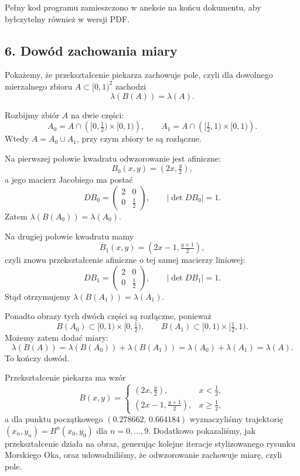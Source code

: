 \documentclass[11pt,a4paper]{article}
\newcommand{\abs}[1]{\left\lvert #1 \right\rvert}
\newcommand{\Leb}{\lambda}
\theoremstyle{plain}
\theoremstyle{definition}
\begin{document}
\begin{rozwiazaniebox}
Pe\l ny kod programu zamieszczono w aneksie na ko\'ncu dokumentu, aby by\l czytelny r\'ownie\.z w wersji PDF.

\subsection*{6. Dow\'od zachowania miary}

Poka\.zemy, \.ze przekszta\l cenie piekarza zachowuje pole, czyli dla dowolnego mierzalnego zbioru
\(A \subset [0,1)^2\) zachodzi
\[
    \Leb(B(A))=\Leb(A).
\]

Rozbijmy zbi\'or \(A\) na dwie cz\k{e}\'sci:
\[
    A_0 = A \cap \left([0,\tfrac{1}{2}) \times [0,1)\right), \qquad
    A_1 = A \cap \left([\tfrac{1}{2},1) \times [0,1)\right).
\]
Wtedy \(A=A_0 \cup A_1\), przy czym zbiory te s\k{a} roz\l \k{a}czne.

Na pierwszej po\l owie kwadratu odwzorowanie jest afiniczne:
\[
    B_0(x,y)=(2x,\tfrac{y}{2}),
\]
a jego macierz Jacobiego ma posta\'c
\[
    DB_0=
    \begin{pmatrix}
        2 & 0\\
        0 & \tfrac{1}{2}
    \end{pmatrix},
    \qquad
    \abs{\det DB_0}=1.
\]
Zatem \(\Leb(B(A_0))=\Leb(A_0)\).

Na drugiej po\l owie kwadratu mamy
\[
    B_1(x,y)=(2x-1,\tfrac{y+1}{2}),
\]
czyli znowu przekszta\l cenie afiniczne o tej samej macierzy liniowej:
\[
    DB_1=
    \begin{pmatrix}
        2 & 0\\
        0 & \tfrac{1}{2}
    \end{pmatrix},
    \qquad
    \abs{\det DB_1}=1.
\]
St\k{a}d otrzymujemy \(\Leb(B(A_1))=\Leb(A_1)\).

Ponadto obrazy tych dw\'och cz\k{e}\'sci s\k{a} roz\l \k{a}czne, poniewa\.z
\[
    B(A_0) \subset [0,1) \times [0,\tfrac{1}{2}),
    \qquad
    B(A_1) \subset [0,1) \times [\tfrac{1}{2},1).
\]
Mo\.zemy zatem doda\'c miary:
\[
    \Leb(B(A))
    = \Leb(B(A_0)) + \Leb(B(A_1))
    = \Leb(A_0) + \Leb(A_1)
    = \Leb(A).
\]
To ko\'nczy dow\'od.

\end{rozwiazaniebox}

\begin{wynikbox}
Przekszta\l cenie piekarza ma wz\'or
\[
    B(x,y)=
    \begin{cases}
    (2x,\tfrac{y}{2}), & x<\tfrac{1}{2},\\
    (2x-1,\tfrac{y+1}{2}), & x\ge \tfrac{1}{2},
    \end{cases}
\]
a dla punktu pocz\k{a}tkowego \((0.278662,\,0.664184)\) wyznaczyli\'smy trajektori\k{e}
\((x_n,y_n)=B^n(x_0,y_0)\) dla \(n=0,\dots,9\). Dodatkowo pokazali\'smy, jak przekszta\l cenie dzia\l a
na obraz, generuj\k{a}c kolejne iteracje stylizowanego rysunku Morskiego Oka, oraz udowodnili\'smy,
\.ze odwzorowanie zachowuje miar\k{e}, czyli pole.
\end{wynikbox}
\end{document}
